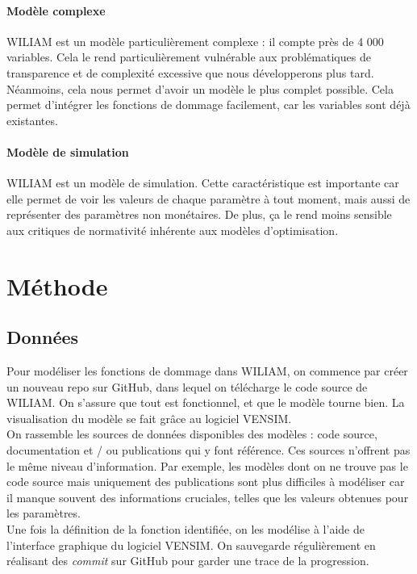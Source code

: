 \paragraph{Modèle complexe} WILIAM est un modèle particulièrement complexe : il compte près de 4 000 variables. Cela le rend particulièrement vulnérable aux problématiques de transparence et de complexité excessive que nous développerons plus tard. Néanmoins, cela nous permet d'avoir un modèle le plus complet possible. Cela permet d'intégrer les fonctions de dommage facilement, car les variables sont déjà existantes. 

\paragraph{Modèle de simulation} WILIAM est un modèle de simulation. Cette caractéristique est importante car elle permet de voir les valeurs de chaque paramètre à tout moment, mais aussi de représenter des paramètres non monétaires. De plus, ça le rend moins sensible aux critiques de normativité inhérente aux modèles d'optimisation. 



\section{Méthode}

\subsection{Données}


\begin{methodbox}

Pour modéliser les fonctions de dommage dans WILIAM, on commence par créer un nouveau repo sur GitHub, dans lequel on télécharge le code source de WILIAM. On s'assure que tout est fonctionnel, et que le modèle tourne bien. La visualisation du modèle se fait grâce au logiciel VENSIM. \\

On rassemble les sources de données disponibles des modèles : code source, documentation et / ou publications qui y font référence. Ces sources n'offrent pas le même niveau d'information. Par exemple, les modèles dont on ne trouve pas le code source mais uniquement des publications sont plus difficiles à modéliser car il manque souvent des informations cruciales, telles que les valeurs obtenues pour les paramètres. \\

Une fois la définition de la fonction identifiée, on les modélise à l'aide de l'interface graphique du logiciel VENSIM. On sauvegarde régulièrement en réalisant des \textit{commit} sur GitHub pour garder une trace de la progression.
    
\end{methodbox}


